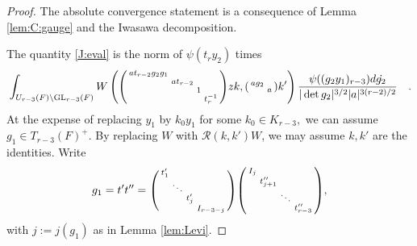 \documentclass[12pt]{amsart}
\theoremstyle{remark}
\numberwithin{equation}{section}
\newcommand{\GL}{\mathrm{GL}}
\theoremstyle{definition}
\newenvironment{psmatrix}
  {\left(\begin{smallmatrix}}
  {\end{smallmatrix}\right)}
\numberwithin{equation}{subsection}
\begin{document}
\begin{proof} 
The absolute convergence statement is a consequence of Lemma \ref{lem:C:gauge} and the Iwasawa decomposition. 

The quantity \eqref{J:eval} is the norm of $\psi(t_ry_2)$ times
\begin{align} \label{before:bounds}\begin{split}
&\int_{U_{r-3}(F) \backslash \GL_{r-3}(F)}W\left(\begin{psmatrix}at_{r-2} g_2g_1 & & &\\ & at_{r-2}  & \\ & & 1 & \\ & & &t_r^{-1}  \end{psmatrix}zk,\begin{psmatrix} ag_2 & \\ & a\end{psmatrix} k' \right)\frac{\psi((g_2y_1)_{r-3})d\dot{g_2}}{|\det g_2|^{3/2}| a|^{3(r-2)/2}} \end{split}.
\end{align}   
At the expense of replacing $y_1$ by $k_0y_1$ for some $k_0 \in K_{r-3},$ we can assume $g_1\in T_{r-3}(F)^+.$  
By replacing $W$ with $\mathcal{R}(k,k')W$, we may assume $k,k'$ are the identities. 
Write 
\begin{align}\label{eq:g1t't''}
    g_1=t't''=\begin{psmatrix}
        t_1'& & & \\
        & \ddots & & \\
        & & t_j' & \\
        & &  & I_{r-3-j}
    \end{psmatrix}\begin{psmatrix}
        I_{j}& & & \\
        & t_{j+1}'' & & \\
        & & \ddots& \\
        & &  & t_{r-3}''
    \end{psmatrix},
\end{align}
with $j:=j(g_1)$ as in Lemma \ref{lem:Levi}.


\end{proof}
\end{document}
